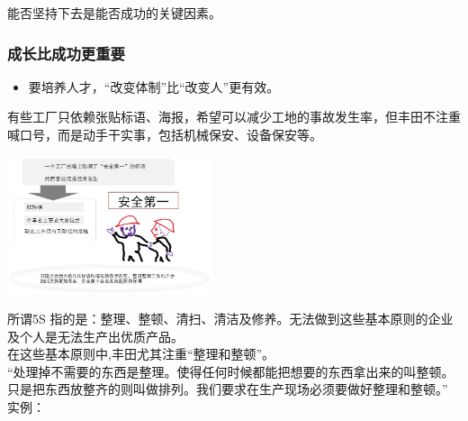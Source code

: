 能否坚持下去是能否成功的关键因素。

\hypertarget{ux6210ux957fux6bd4ux6210ux529fux66f4ux91cdux8981}{%
\subsubsection{成长比成功更重要}\label{ux6210ux957fux6bd4ux6210ux529fux66f4ux91cdux8981}}

\begin{itemize}
\tightlist
\item
  要培养人才，``改变体制''比``改变人''更有效。\\
\end{itemize}

有些工厂只依赖张贴标语、海报，希望可以减少工地的事故发生率，但丰田不注重喊口号，而是动手干实事，包括机械保安、设备保安等。


\includegraphics[width=6cm]{Ft_223111.jpg}

所谓5S
指的是：整理、整顿、清扫、清洁及修养。无法做到这些基本原则的企业及个人是无法生产出优质产品。\\
在这些基本原则中,丰田尤其注重``整理和整顿''。\\
``处理掉不需要的东西是整理。使得任何时候都能把想要的东西拿出来的叫整顿。只是把东西放整齐的则叫做排列。我们要求在生产现场必须要做好整理和整顿。''\\
实例：

